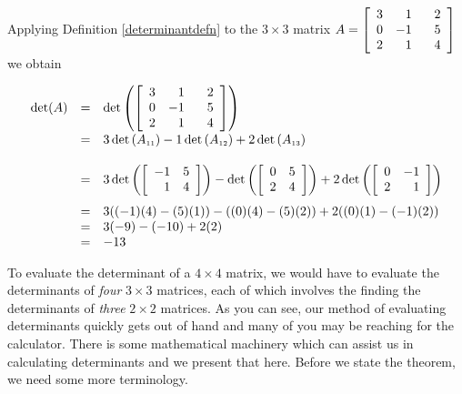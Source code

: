 \documentclass{ximera}
\begin{document}
Applying Definition \ref{determinantdefn} to the $3 \times 3$ matrix $A =  \left[ \begin{array}{rrr} 3 & 1 & \hphantom{-}2 \\ 0 & -1 & 5 \\ 2 & 1 & 4 \\ \end{array} \right]$ we obtain

\[ \begin{array}{rcl} 

\det(A) & = & \det \left( \left[ \begin{array}{rrr} 3 & 1 & \hphantom{-}2 \\ 0 & -1 & 5 \\ 2 & 1 & 4 \\ \end{array} \right] \right)\\[13pt]
        & = & 3\det\left(A_{\mbox{\tiny$11$}}\right) - 1\det\left(A_{\mbox{\tiny$12$}}\right) + 2\det\left(A_{\mbox{\tiny$13$}}\right) \\[13pt]
        & = & 3\det \left( \left[ \begin{array}{rr} -1 & 5 \\ 1 & 4 \\ \end{array} \right] \right) - \det \left( \left[ \begin{array}{rr} 0 & 5 \\ 2 & 4 \\ \end{array} \right] \right) + 2 \det \left( \left[ \begin{array}{rr} 0 & -1 \\ 2 & 1 \\ \end{array} \right] \right) \\[13pt]
        & = & 3((-1)(4) - (5)(1)) - ((0)(4)-(5)(2))+2((0)(1)-(-1)(2)) \\
        & = & 3(-9)-(-10)+2(2) \\
        & = & -13 \\ \end{array}  \]

To evaluate the determinant of a $4 \times 4$ matrix, we would have to evaluate the determinants of \textit{four} $3 \times 3$ matrices, each of which involves the finding the determinants of \textit{three} $2 \times 2$ matrices. As you can see, our method of evaluating determinants quickly gets out of hand and many of you may be reaching for the calculator.  There is some mathematical machinery which can assist us in calculating determinants and we present that here.  Before we state the theorem, we need some more terminology.
\end{document}

